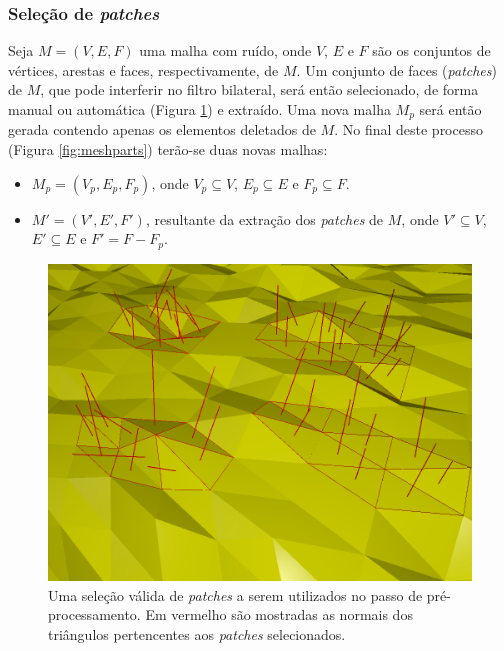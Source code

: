 \subsubsection{Seleção de \textit{patches}}

Seja $M = (V,E,F)$ uma malha com ruído, onde $V$, $E$ e $F$ são os conjuntos de vértices, arestas e faces, respectivamente, de $M$. Um conjunto de faces (\textit{patches}) de $M$, que pode interferir no filtro bilateral, será então selecionado, de forma manual ou automática (Figura \ref{fig:validselection}) e extraído. Uma nova malha $M_p$ será então gerada contendo apenas os elementos deletados de $M$. No final deste processo (Figura \ref{fig:meshparts}) terão-se duas novas malhas: 

\begin{itemize}  
\item $M_p = (V_p,E_p,F_p)$, onde $V_p \subseteq V$, $E_p \subseteq E$ e $F_p \subseteq F$.
\item $M' = (V', E', F')$, resultante da extração dos \textit{patches} de $M$, onde $V' \subseteq V$, $E' \subseteq E$ e $F' = F - F_p$.
\end{itemize}


\begin{figure}[!h]
\captionsetup{width=\linewidth}
\centering
\includegraphics[scale=0.30]{figuras/validselection.png}
\caption{Uma seleção válida de \textit{patches} a serem utilizados no passo de pré-processamento. Em vermelho são mostradas as normais dos triângulos pertencentes aos \textit{patches} selecionados.}
\label{fig:validselection}
\end{figure}


